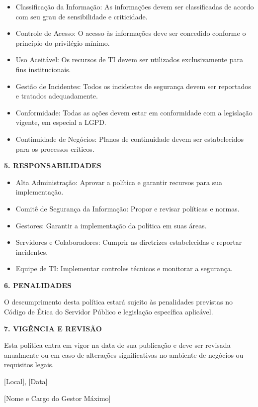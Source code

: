 \documentclass[12pt,a4paper]{report}
\begin{document}
\begin{tcolorbox}[colback=boxcolor,colframe=sectioncolor,arc=2mm,title=\textbf{POLÍTICA DE SEGURANÇA DA INFORMAÇÃO}]
\begin{itemize}
  \item Classificação da Informação: As informações devem ser classificadas de acordo com seu grau de sensibilidade e criticidade.
  \item Controle de Acesso: O acesso às informações deve ser concedido conforme o princípio do privilégio mínimo.
  \item Uso Aceitável: Os recursos de TI devem ser utilizados exclusivamente para fins institucionais.
  \item Gestão de Incidentes: Todos os incidentes de segurança devem ser reportados e tratados adequadamente.
  \item Conformidade: Todas as ações devem estar em conformidade com a legislação vigente, em especial a LGPD.
  \item Continuidade de Negócios: Planos de continuidade devem ser estabelecidos para os processos críticos.
\end{itemize}

\textbf{5. RESPONSABILIDADES}

\begin{itemize}
  \item Alta Administração: Aprovar a política e garantir recursos para sua implementação.
  \item Comitê de Segurança da Informação: Propor e revisar políticas e normas.
  \item Gestores: Garantir a implementação da política em suas áreas.
  \item Servidores e Colaboradores: Cumprir as diretrizes estabelecidas e reportar incidentes.
  \item Equipe de TI: Implementar controles técnicos e monitorar a segurança.
\end{itemize}

\textbf{6. PENALIDADES}

O descumprimento desta política estará sujeito às penalidades previstas no Código de Ética do Servidor Público e legislação específica aplicável.

\textbf{7. VIGÊNCIA E REVISÃO}

Esta política entra em vigor na data de sua publicação e deve ser revisada anualmente ou em caso de alterações significativas no ambiente de negócios ou requisitos legais.

\hspace{10cm} [Local], [Data]

\hspace{8cm} [Nome e Cargo do Gestor Máximo]
\end{tcolorbox}
\end{document}

